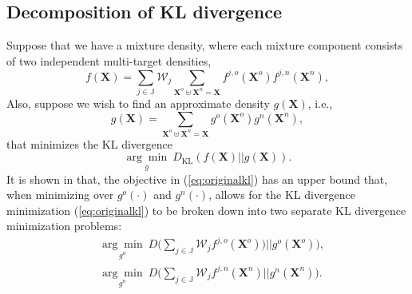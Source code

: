 \documentclass[journal]{IEEEtran}
\newcommand{\setX}{\mathbf{X}}
\begin{document}
\subsection{Decomposition of KL divergence}
\label{section:kldecomposition}
Suppose that we have a mixture density, where each mixture component consists of two independent multi-target densities,
\begin{equation}
    f(\setX) = \sum_{j\in\mathbb{J}} \mathcal{W}_j  \sum_{\setX^o \uplus \setX^n = \setX } f^{j,o}(\setX^o) f^{j,n} (\setX^n),
\end{equation}
Also, suppose we wish to find an approximate density $g(\mathbf{X})$, i.e.,
\begin{equation}
    g(\setX) = \sum_{\setX^o \uplus \setX^n = \setX } g^{o}(\setX^o) g^{n} (\setX^n),
\end{equation}
that minimizes the KL divergence
\begin{equation}
    \underset{g}{\arg\min}~D_{\text{KL}}(f(\mathbf{X})||g(\mathbf{X})).
    \label{eq:originalkl}
\end{equation}
It is shown in \cite[Theorem 1]{recycle} that, the objective in (\ref{eq:originalkl}) has an upper bound that, when minimizing over $g^o(\cdot)$ and $g^n(\cdot)$, allows for the KL divergence minimization (\ref{eq:originalkl}) to be broken down into two separate KL divergence minimization problems:
\begin{subequations}
\begin{align}
    & \underset{g^o}{\arg\min}~D\bigg( \sum_{j\in\mathbb{J}} \mathcal{W}_j f^{j,o} (\setX^o)) || g^o(\setX^o) \bigg), \\
    & \underset{g^n}{\arg\min}~D\bigg( \sum_{{j\in\mathbb{J}}} \mathcal{W}_j f^{j,n} (\setX^n) || g^n(\setX^n)  \bigg).
\end{align}
\end{subequations}
\end{document}
